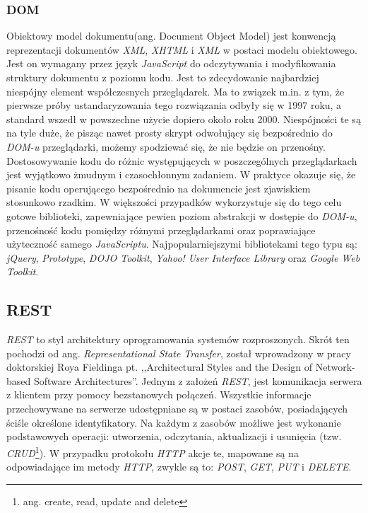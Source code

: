 \documentclass[a4paper,12pt]{article}
\begin{document}
\subsubsection{DOM}
Obiektowy model dokumentu(ang. Document Object Model) jest konwencją
reprezentacji dokumentów \emph{XML}, \emph{XHTML} i \emph{XML} w
postaci modelu obiektowego. Jest on wymagany przez język
\emph{JavaScript} do odczytywania i modyfikowania struktury dokumentu
z poziomu kodu\cite{dom}. Jest to zdecydowanie najbardziej niespójny
element współczesnych przeglądarek. Ma to związek m.in. z tym, że
pierwsze próby ustandaryzowania tego rozwiązania odbyły się w 1997
roku, a standard wszedł w powszechne użycie dopiero około roku
2000. Niespójności te są na tyle duże, że pisząc nawet prosty skrypt
odwołujący się bezpośrednio do \emph{DOM-u} przeglądarki, możemy
spodziewać się, że nie będzie on przenośny. Dostosowywanie kodu do
różnic występujących w poszczególnych przeglądarkach jest wyjątkowo
żmudnym i czasochłonnym zadaniem. W praktyce okazuje się, że pisanie
kodu operującego bezpośrednio na dokumencie jest zjawiskiem stosunkowo
rzadkim. W większości przypadków wykorzystuje się do tego celu gotowe
biblioteki, zapewniające pewien poziom abstrakcji w dostępie do
\emph{DOM-u}, przenośność kodu pomiędzy różnymi przeglądarkami oraz
poprawiające użyteczność samego
\emph{JavaScriptu}. Najpopularniejszymi bibliotekami tego typu są:
\emph{jQuery}, \emph{Prototype}, \emph{DOJO Toolkit}, \emph{Yahoo!
  User Interface Library} oraz \emph{Google Web Toolkit}.

\subsection{REST}
\emph{REST} to styl architektury oprogramowania systemów
rozproszonych. Skrót ten pochodzi od ang. \emph{Representational State
  Transfer}, został wprowadzony w pracy doktorskiej Roya Fieldinga
pt. ,,Architectural Styles and the Design of Network-based Software
Architectures''\cite{rest}. Jednym z założeń \emph{REST}, jest
komunikacja serwera z klientem przy pomocy bezstanowych
połączeń. Wszystkie informacje przechowywane na serwerze udostępniane
są w postaci zasobów, posiadających ściśle określone
identyfikatory. Na każdym z zasobów możliwe jest wykonanie
podstawowych operacji: utworzenia, odczytania, aktualizacji i
usunięcia (tzw. \emph{CRUD}\footnote{ang. create, read, update and
  delete}). W przypadku protokołu \emph{HTTP} akcje te, mapowane są na
odpowiadające im metody \emph{HTTP}, zwykle są to: \emph{POST},
\emph{GET}, \emph{PUT} i \emph{DELETE}\cite{agile}.
\end{document}

